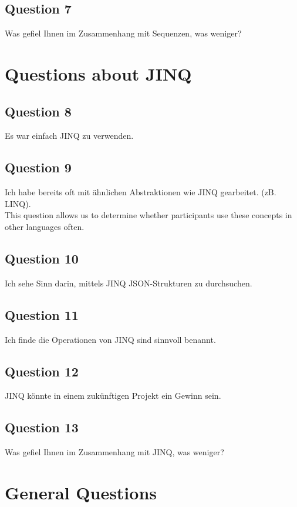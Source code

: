 \subsection{Question 7}
Was gefiel Ihnen im Zusammenhang mit Sequenzen, was weniger?
\label{sub:ut_q7}
\section{Questions about JINQ} %
\label{sec:Questions about JINQ}

\subsection{Question 8}
\label{sub:ut_q8}
Es war einfach JINQ zu verwenden.
\subsection{Question 9}
Ich habe bereits oft mit ähnlichen Abstraktionen wie JINQ gearbeitet. (zB.
LINQ).\\
This question allows us to determine whether participants use these concepts in
other languages often.
\label{sub:ut_q9}
\subsection{Question 10}
\label{sub:ut_q10}
Ich sehe Sinn darin, mittels JINQ JSON-Strukturen zu durchsuchen. 
\subsection{Question 11}
\label{sub:ut_q11}
Ich finde die Operationen von JINQ sind sinnvoll benannt.
\subsection{Question 12}
\label{sub:ut_q12}
JINQ könnte in einem zukünftigen Projekt ein Gewinn sein.
\subsection{Question 13}
\label{sub:ut_q13}
Was gefiel Ihnen im Zusammenhang mit JINQ, was weniger?

\section{General Questions} %
\label{sec:General Questions}

